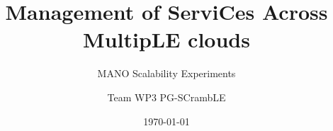 \title{Management of ServiCes Across MultipLE clouds} 

\subtitle{MANO Scalability Experiments}

\author{Team WP3 PG-SCrambLE}


\date{\today} 

\newcommand{\upbcolor}{uni-blue} 

